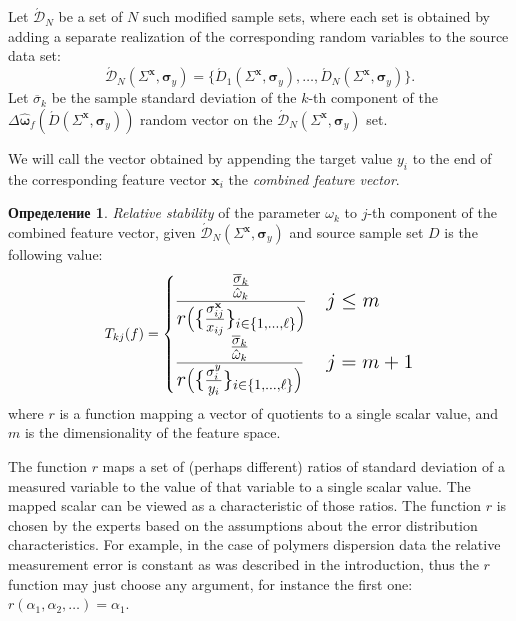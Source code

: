\documentclass[11pt,a4paper]{article}
\theoremstyle{definition}
\newtheorem{defin}{Определение}
\begin{document}
Let $\acute{\mathcal{D}}_N$ be a set of $N$ such modified sample sets, where each
set is obtained by adding a separate realization of the corresponding random variables
to the source data set:
\[
  \acute{\mathcal{D}}_N (\Sigma^{\mathbf{x}}, \boldsymbol{\sigma}_y) = \{ \acute{D}_1 (\Sigma^{\mathbf{x}}, \boldsymbol{\sigma}_y), \dots, \acute{D}_N (\Sigma^{\mathbf{x}}, \boldsymbol{\sigma}_y) \}.
\]
Let $\overline{\sigma}_k$ be the sample standard deviation of the $k$-th component of the
$\Delta\hat{\boldsymbol{\omega}}_f(\acute{D} (\Sigma^{\mathbf{x}}, \boldsymbol{\sigma}_y) )$
random vector on the $\acute{\mathcal{D}}_N (\Sigma^{\mathbf{x}}, \boldsymbol{\sigma}_y)$ set.

We will call the vector obtained by appending the target value $y_i$ to the end of the
corresponding feature vector $\mathbf{x}_i$ the \emph{combined feature vector}.

\begin{defin}
\emph{Relative stability} of the parameter $\omega_k$ to $j$-th component of the combined
feature vector, given $\acute{\mathcal{D}}_N (\Sigma^{\mathbf{x}}, \boldsymbol{\sigma}_y)$
and source sample set $D$ is the following value:
\begin{equation}
  \Large
  T_{kj}(f) =
	\begin{cases}
	  \displaystyle
		\frac{\frac{\overline{\sigma}_k}{\hat{\omega}_k}}{r\big(\{ \frac{\sigma_{ij}^{\mathbf{x}}}{x_{ij}} \}_{i \in \{ 1, \dots, \ell \}}\big)} & j \leq m \\
	  \displaystyle
		\frac{\frac{\overline{\sigma}_k}{\hat{\omega}_k}}{r\big(\{ \frac{\sigma_{i}^{y}}{y_i} \}_{i \in \{ 1, \dots, \ell \}}\big)} & j = m + 1
	\end{cases}
  \label{eq:t_rel}
\end{equation}
where $r$ is a function mapping a vector of quotients to a single scalar value, and $m$
is the dimensionality of the feature space.
\end{defin}

The function $r$ maps a set of (perhaps different) ratios of standard
deviation of a measured variable to the value of that variable to a single scalar value.
The mapped scalar can be
viewed as a characteristic of those ratios. The function $r$ is chosen by the
experts based on the assumptions about the error distribution characteristics. For example,
in the case of polymers dispersion data the relative measurement error is constant as was
described in the introduction, thus the $r$ function may just choose any argument, for
instance the first one: $r(\alpha_1, \alpha_2, \dots) = \alpha_1$.
\end{document}
